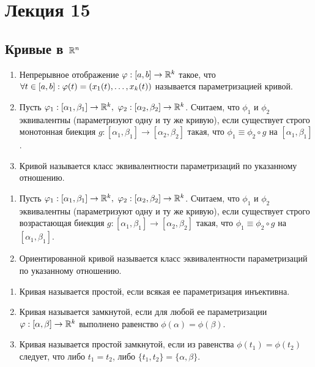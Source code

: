 \section{Лекция 15}
\subsection{Кривые в $\R^n$}
\begin{definition}\tab
    \begin{enumerate}
        \item Непрерывное отображение $\phi: [a,b]\to \R^k$ такое, что $\forall t\in [a,b]:\\ \phi(t)=(x_1(t), \dots, x_k(t))$ называется параметризацией кривой.
        \item Пусть $\phi_1:[\alpha_1, \beta_1]\to \R^k,\ \phi_2:[\alpha_2, \beta_2]\to \R^k$. Считаем, что $\phi_1$ и $\phi_2$ эквивалентны (параметризуют одну и ту же кривую), если существует строго монотонная биекция $g: [\alpha_1, \beta_1]\to [\alpha_2, \beta_2]$ такая, что $\phi_1\equiv \phi_2 \circ g$ на $[\alpha_1, \beta_1]$.
        \item Кривой называется класс эквивалентности параметризаций по указанному отношению.
    \end{enumerate}
\end{definition}
\begin{definition}\tab
    \begin{enumerate}
        \item Пусть $\phi_1:[\alpha_1, \beta_1]\to \R^k,\ \phi_2:[\alpha_2, \beta_2]\to \R^k$. Считаем, что $\phi_1$ и $\phi_2$ эквивалентны (параметризуют одну и ту же кривую), если существует строго возрастающая биекция $g: [\alpha_1, \beta_1]\to [\alpha_2, \beta_2]$ такая, что $\phi_1\equiv \phi_2 \circ g$ на $[\alpha_1, \beta_1]$.
        \item Ориентированной кривой называется класс эквивалентности параметризаций по указанному отношению.
    \end{enumerate}
\end{definition}
\begin{definition}\tab
    \begin{enumerate}
        \item Кривая называется простой, если всякая ее параметризация инъективна.
        \item Кривая называется замкнутой, если для любой ее параметризации \\
        $\phi: [\alpha,\beta]\to \R^k$ выполнено равенство $\phi(\alpha)=\phi(\beta)$.
        \item Кривая называется простой замкнутой, если из равенства $\phi(t_1)=\phi(t_2)$ следует, что либо $t_1= t_2$, либо $\{t_1, t_2\}=\{\alpha,\beta\}$.
    \end{enumerate}
\end{definition}

